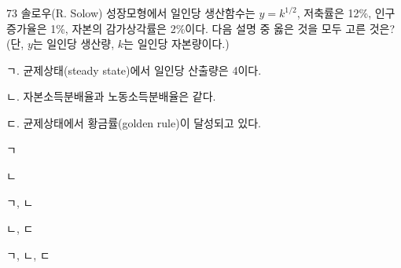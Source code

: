 \begin{question}{73}
솔로우(R. Solow) 성장모형에서 일인당 생산함수는 $y=k^{1/2}$, 저축률은 12\%, 인구증가율은 1\%, 자본의 감가상각률은 2\%이다. 다음 설명 중 옳은 것을 모두 고른 것은? (단, $y$는 일인당 생산량, $k$는 일인당 자본량이다.)
\begin{framedtext}
ㄱ. 균제상태(steady state)에서 일인당 산출량은 4이다. \par
ㄴ. 자본소득분배율과 노동소득분배율은 같다. \par
ㄷ. 균제상태에서 황금률(golden rule)이 달성되고 있다. \par
\end{framedtext}
\begin{choices}
  \item ㄱ
  \item ㄴ
  \item ㄱ, ㄴ
  \item ㄴ, ㄷ
  \item ㄱ, ㄴ, ㄷ
\end{choices}
\end{question}
